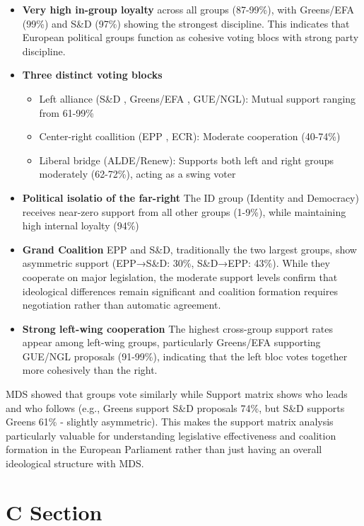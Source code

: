 \documentclass[a4paper]{scrartcl}
\begin{document}
\begin{itemize}
    \item \textbf{Very high in-group loyalty} across all groups (87-99\%), with Greens/EFA (99\%) and S\&D (97\%) showing the strongest discipline. This indicates that European political groups function as cohesive voting blocs with strong party discipline.
    \item \textbf{Three distinct voting blocks}
    \begin{itemize}
        \item Left alliance (S\&D , Greens/EFA , GUE/NGL): Mutual support ranging from 61-99\%
        \item Center-right coallition  (EPP , ECR): Moderate cooperation (40-74\%)
        \item Liberal bridge (ALDE/Renew): Supports both left and right groups moderately (62-72\%), acting as a swing voter
    \end{itemize}
    \item \textbf{Political isolatio of the far-right} The ID group (Identity and Democracy) receives near-zero support from all other groups (1-9\%), while maintaining high internal loyalty (94\%)
    \item \textbf{Grand Coalition} EPP and S\&D, traditionally the two largest groups, show asymmetric support (EPP→S\&D: 30\%, S\&D→EPP: 43\%). While they cooperate on major legislation, the moderate support levels confirm that ideological differences remain significant and coalition formation requires negotiation rather than automatic agreement. 
    \item \textbf{Strong left-wing cooperation} The highest cross-group support rates appear among left-wing groups, particularly Greens/EFA supporting GUE/NGL proposals (91-99\%), indicating that the left bloc votes together more cohesively than the right.
\end{itemize}
MDS showed that groups vote similarly while Support matrix shows who leads and who follows (e.g., Greens support S\&D proposals 74\%, but S\&D supports Greens 61\% - slightly asymmetric). This makes the support matrix analysis particularly valuable for understanding legislative effectiveness and coalition formation in the European Parliament rather than just having an overall ideological structure with MDS.

\section*{C Section}
\end{document}
